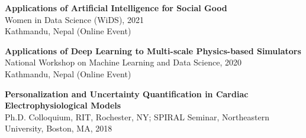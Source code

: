 \documentclass[margin]{res}
\begin{document}
\begin{resume}
\textbf{Applications of Artificial Intelligence for Social Good}\\
{Women in Data Science (WiDS), 2021\\}Kathmandu, Nepal (Online Event)

\textbf{Applications of Deep Learning to Multi-scale Physics-based Simulators}\\
{National Workshop on Machine Learning and Data Science, 2020\\}Kathmandu, Nepal (Online Event)

\textbf{Personalization and Uncertainty Quantification in Cardiac Electrophysiological Models}\\
{Ph.D. Colloquium, RIT, Rochester, NY; SPIRAL Seminar, Northeastern University, Boston, MA, 2018}
\end{resume}
\end{document}

